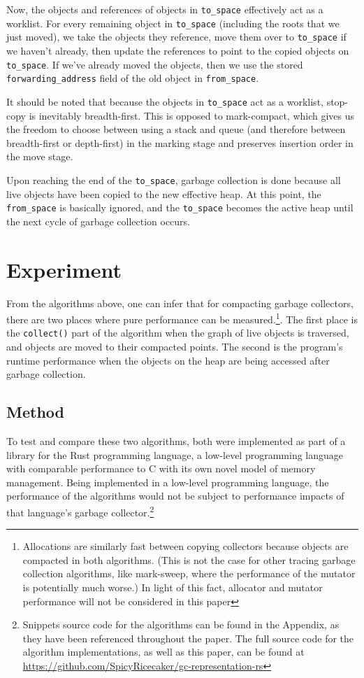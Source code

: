 \documentclass[index]{subfiles}
\begin{document}
Now, the objects and references of objects in \verb+to_space+ effectively act as a worklist. For every remaining object in \verb+to_space+ (including the roots that we just moved), we take the objects they reference, move them over to \verb+to_space+ if we haven't already, then update the references to point to the copied objects on \verb+to_space+. If we've already moved the objects, then we use the stored \verb+forwarding_address+ field of the old object in \verb+from_space+.

It should be noted that because the objects in \verb+to_space+ act as a worklist, stop-copy is inevitably breadth-first. This is opposed to mark-compact, which gives us the freedom to choose between using a stack and queue (and therefore between breadth-first or depth-first) in the marking stage and preserves insertion order in the move stage.

Upon reaching the end of the \verb+to_space+, garbage collection is done because all live objects have been copied to the new effective heap. At this point, the \verb+from_space+ is basically ignored, and the \verb+to_space+ becomes the active heap until the next cycle of garbage collection occurs.

\section{Experiment}

From the algorithms above, one can infer that for compacting garbage collectors, there are two places where pure performance can be measured.\footnote{Allocations are similarly fast between copying collectors because objects are compacted in both algorithms. (This is not the case for other tracing garbage collection algorithms, like mark-sweep, where the performance of the mutator is potentially much worse.) In light of this fact, allocator and mutator performance will not be considered in this paper}. The first place is the \verb+collect()+ part of the algorithm when the graph of live objects is traversed, and objects are moved to their compacted points. The second is the program's runtime performance when the objects on the heap are being accessed after garbage collection.

\subsection{Method}

To test and compare these two algorithms, both were implemented as part of a library for the Rust programming language, a low-level programming language with comparable performance to C with its own novel model of memory management. Being implemented in a low-level programming language, the performance of the algorithms would not be subject to performance impacts of that language's garbage collector.\footnote{Snippets source code for the algorithms can be found in the Appendix, as they have been referenced throughout the paper. The full source code for the algorithm implementations, as well as this paper, can be found at \href{https://github.com/SpicyRicecaker/gc-representation-rs}{https://github.com/SpicyRicecaker/gc-representation-rs}}
\end{document}
